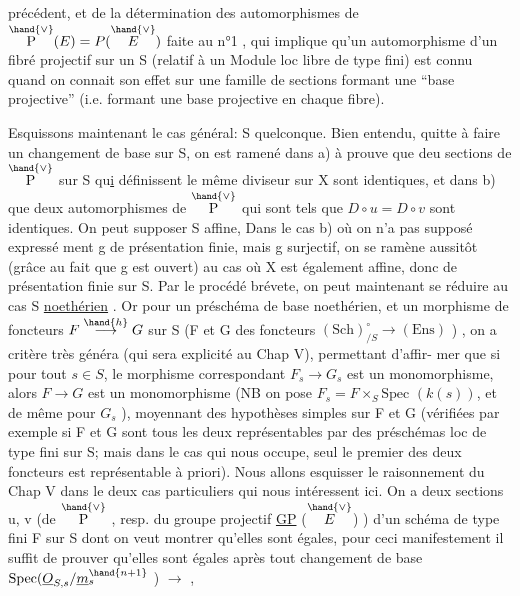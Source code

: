
précédent, et de la détermination des automorphismes de $\overset{\hand{\vee}}{\mathrm{P}}(E) = P(\overset{\hand{\vee}}{E})$ faite
au n°1 , qui implique qu'un automorphisme d'un fibré projectif sur un S
(relatif à un Module loc libre de type fini)  est connu quand on connait
son effet sur une famille de sections formant une ``base projective''
(i.e. formant une base projective en chaque  fibre).

Esquissons maintenant le cas général: S quelconque.  Bien entendu,
quitte à faire un changement de base sur S, on est ramené dans a) à prouve
que deu sections  de $\overset{\hand{\vee}}{\mathrm{P}}$ sur S  qu\uline{i} définissent le même diviseur sur X sont
identiques, et dans b) que deux automorphismes  de $\overset{\hand{\vee}}{\mathrm{P}}$  qui sont tels que
$D\circ u = D\circ v$  sont identiques. On peut supposer  S affine, Dans le cas b) où on n'a pas supposé expressé%
ment  g de présentation finie, mais g surjectif, on se ramène aussitôt
(grâce au fait que g est ouvert) au cas où X est également affine, donc
de présentation finie sur S.  Par le procédé brévete, on peut maintenant
se réduire au cas S \uline{noethérien} .  Or pour un préschéma de base  noethérien,
et un morphisme de foncteurs  $F \overset{\hand{h}}{\longrightarrow} G$ sur S  (F et G des foncteurs
$(\mathrm{Sch})_{/S}^{\circ} \longrightarrow (\mathrm{Ens})$ ) ,  on a  critère très généra (qui sera explicité au Chap V), permettant d'affir-%
mer que si  pour tout  $s \in S$, le morphisme correspondant $F_s \longrightarrow G_s$ est
un monomorphisme, alors $F \longrightarrow G$ est un monomorphisme  (NB on pose $F_s{=}F\times_S\mathrm{Spec}$
$(k(s))$, et de même pour $G_s$ ),  moyennant des hypothèses simples sur F et G
(vérifiées par exemple si F et G sont tous les deux représentables par des
préschémas loc de type fini sur S; mais dans le cas qui nous occupe, seul
le premier des deux foncteurs est représentable à priori).  Nous allons
esquisser le raisonnement du Chap V  dans le deux cas particuliers qui nous
intéressent ici.  On a deux sections u, v (de $\overset{\hand{\vee}}{\mathrm{P}}$ , resp. du groupe projectif
\uline{GP} ($\overset{\hand{\vee}}{E}$) ) d'un schéma de type fini F sur S dont on veut montrer qu'elles
sont égales, pour ceci manifestement il suffit de prouver qu'elles sont
égales après tout changement de base  $\mathrm{Spec}(\underline{O}_{S,s}/\underline{m}_s^{\hand{n+1}}$ ) $\longrightarrow$ ,

